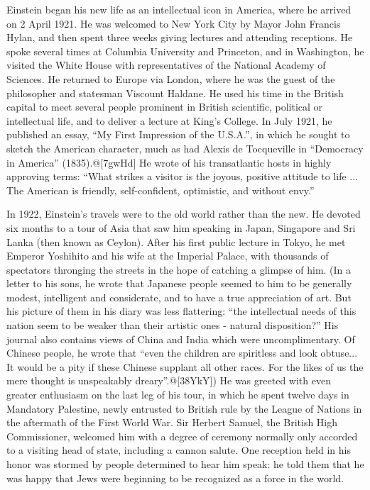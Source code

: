 \documentclass[twoside]{memoir}
\begin{document}
Einstein began his new life as an intellectual icon in America, where he arrived on 2 April 1921. He was welcomed to New York City by Mayor John Francis Hylan, and then spent three weeks giving lectures and attending receptions. He spoke several times at Columbia University and Princeton, and in Washington, he visited the White House with representatives of the National Academy of Sciences. He returned to Europe via London, where he was the guest of the philosopher and statesman Viscount Haldane. He used his time in the British capital to meet several people prominent in British scientific, political or intellectual life, and to deliver a lecture at King's College. In July 1921, he published an essay, \enquote{My First Impression of the U.S.A.}, in which he sought to sketch the American character, much as had Alexis de Tocqueville in \enquote{Democracy in America} (1835).@[7gwHd] He wrote of his transatlantic hosts in highly approving terms: \enquote{What strikes a visitor is the joyous, positive attitude to life ... The American is friendly, self-confident, optimistic, and without envy.}

In 1922, Einstein's travels were to the old world rather than the new. He devoted six months to a tour of Asia that saw him speaking in Japan, Singapore and Sri Lanka (then known as Ceylon). After his first public lecture in Tokyo, he met Emperor Yoshihito and his wife at the Imperial Palace, with thousands of spectators thronging the streets in the hope of catching a glimpse of him. (In a letter to his sons, he wrote that Japanese people seemed to him to be generally modest, intelligent and considerate, and to have a true appreciation of art. But his picture of them in his diary was less flattering: \enquote{the intellectual needs of this nation seem to be weaker than their artistic ones - natural disposition?} His journal also contains views of China and India which were uncomplimentary. Of Chinese people, he wrote that \enquote{even the children are spiritless and look obtuse... It would be a pity if these Chinese supplant all other races. For the likes of us the mere thought is unspeakably dreary}.@[38YkY]) He was greeted with even greater enthusiasm on the last leg of his tour, in which he spent twelve days in Mandatory Palestine, newly entrusted to British rule by the League of Nations in the aftermath of the First World War. Sir Herbert Samuel, the British High Commissioner, welcomed him with a degree of ceremony normally only accorded to a visiting head of state, including a cannon salute. One reception held in his honor was stormed by people determined to hear him speak: he told them that he was happy that Jews were beginning to be recognized as a force in the world.
\end{document}
